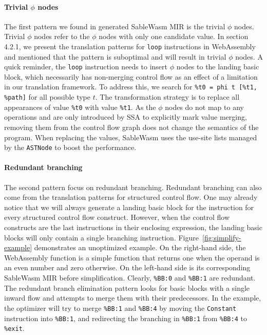 \paragraph{Trivial $\phi$ nodes}
The first pattern we found in generated SableWasm MIR is the trivial $\phi$
nodes. Trivial $\phi$ nodes refer to the $\phi$ nodes with only one candidate
value. In section 4.2.1, we present the translation patterns for \texttt{loop}
instructions in WebAssembly and mentioned that the pattern is suboptimal and
will result in trivial $\phi$ nodes. A quick reminder, the \texttt{loop}
instruction needs to insert $\phi$ nodes to the landing basic block, which
necessarily has non-merging control flow as an effect of a limitation in our
translation framework. To address this, we search for
\texttt{\%t0 = phi t [\%t1, \%path]} for all possible type $t$. The
transformation strategy is to replace all appearances of value \texttt{\%t0}
with value \texttt{\%t1}. As the $\phi$ nodes do not map to any operations
and are only introduced by SSA to explicitly mark value merging, removing them
from the control flow graph does not change the semantics of the program. When
replacing the values, SableWasm uses the use-site lists managed by the
\texttt{ASTNode} to boost the performance.

\paragraph{Redundant branching}
The second pattern focus on redundant branching. Redundant branching can also
come from the translation patterns for structured control flow. One may already
notice that we will always generate a landing basic block for the instruction
for every structured control flow construct. However, when the control flow
constructs are the last instructions in their enclosing expression, the landing
basic blocks will only contain a single branching instruction.
Figure~\ref{fig:simplify-example} demonstrates an unoptimized example. On the
right-hand side, the WebAssembly function is a simple function that returns one
when the operand is an even number and zero otherwise. On the left-hand side is
its corresponding SableWasm MIR before simplification. Clearly, \texttt{\%BB:0}
and \texttt{\%BB:1} are redundant. The redundant branch elimination pattern
looks for basic blocks with a single inward flow and attempts to merge them
with their predecessors. In the example, the optimizer will try to merge
\texttt{\%BB:1} and \texttt{\%BB:4} by moving the \texttt{Constant} instruction
into \texttt{\%BB:1}, and redirecting the branching in \texttt{\%BB:1} from
\texttt{\%BB:4} to \texttt{\%exit}.

